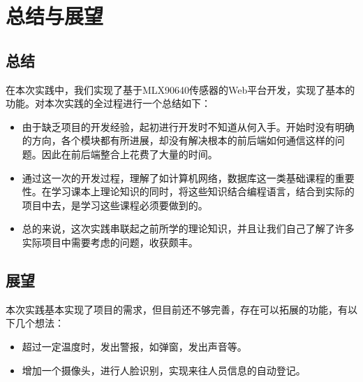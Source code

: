 \chapter{总结与展望}
\section{总结}
在本次实践中，我们实现了基于MLX90640传感器的Web平台开发，实现了基本的功能。对本次实践的全过程进行一个总结如下：
\begin{itemize}
    \item 由于缺乏项目的开发经验，起初进行开发时不知道从何入手。开始时没有明确的方向，各个模块都有所进展，却没有解决根本的前后端如何通信这样的问题。因此在前后端整合上花费了大量的时间。
    \item 通过这一次的开发过程，理解了如计算机网络，数据库这一类基础课程的重要性。在学习课本上理论知识的同时，将这些知识结合编程语言，结合到实际的项目中去，是学习这些课程必须要做到的。
    \item 总的来说，这次实践串联起之前所学的理论知识，并且让我们自己了解了许多实际项目中需要考虑的问题，收获颇丰。
    \end{itemize}
\section{展望}
本次实践基本实现了项目的需求，但目前还不够完善，存在可以拓展的功能，有以下几个想法：
\begin{itemize}
    \item 超过一定温度时，发出警报，如弹窗，发出声音等。
    \item 增加一个摄像头，进行人脸识别，实现来往人员信息的自动登记。
    \end{itemize}
